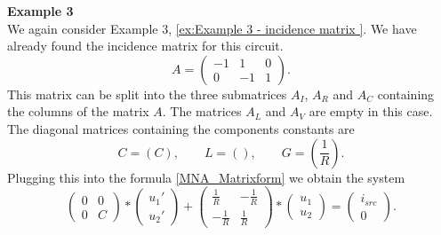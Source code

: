 \textbf{Example 3} \label{ex:Example 3 - MNA} \\
We again consider Example 3, \ref{ex:Example 3 - incidence matrix }. We have already found the incidence matrix for this circuit.
\begin{displaymath}
	A = 
	\left(
	\begin{matrix}
		-1 & 1 & 0 \\
		0 & -1 & 1 
	\end{matrix}
	\right).
\end{displaymath} 
This matrix can be split into the three submatrices $A_I$, $A_R$ and $A_C$ containing the columns of the matrix $A$. The matrices $A_L$ and $A_V$ are empty in this case. The diagonal matrices containing the components constants are
\begin{displaymath}
	C = (C), \qquad L = (), \qquad G = (\frac{1}{R}).
\end{displaymath}
Plugging this into the formula \eqref{MNA_Matrixform} we obtain the system
\begin{displaymath}
	\begin{pmatrix}
		0 & 0 \\
		0 & C 
	\end{pmatrix}
	*
	\begin{pmatrix}
		u_1' \\
		u_2'
	\end{pmatrix}
	+
	\begin{pmatrix}
		\frac{1}{R} & -\frac{1}{R} \\
		-\frac{1}{R} & \frac{1}{R}
	\end{pmatrix}
	*
	\begin{pmatrix}
		u_1 \\
		u_2 
	\end{pmatrix}
	=
	\begin{pmatrix}
		i_{src} \\
		0
	\end{pmatrix}.
\end{displaymath}



